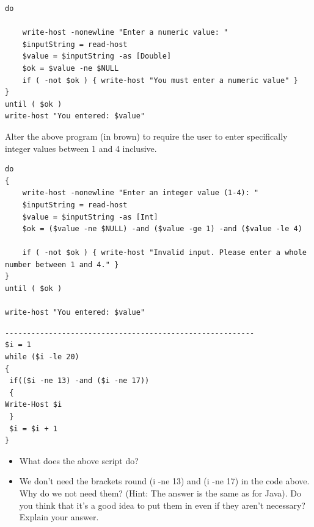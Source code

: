 \documentclass[a4paper]{article}
\begin{document}
\begin{verbatim}
do

    write-host -nonewline "Enter a numeric value: "
    $inputString = read-host
    $value = $inputString -as [Double]
    $ok = $value -ne $NULL
    if ( -not $ok ) { write-host "You must enter a numeric value" }
}
until ( $ok )
write-host "You entered: $value"
\end{verbatim}
\textcolor{green!50!black}{
    Alter the above program (in brown) to require the user to enter
    specifically integer values between 1 and 4 inclusive.
}
\begin{verbatim}
do
{
    write-host -nonewline "Enter an integer value (1-4): "
    $inputString = read-host
    $value = $inputString -as [Int]  
    $ok = ($value -ne $NULL) -and ($value -ge 1) -and ($value -le 4) 
    
    if ( -not $ok ) { write-host "Invalid input. Please enter a whole number between 1 and 4." }
}
until ( $ok )

write-host "You entered: $value"
\end{verbatim}
\begin{verbatim}
---------------------------------------------------------
$i = 1
while ($i -le 20)
{
 if(($i -ne 13) -and ($i -ne 17))
 {
Write-Host $i
 }
 $i = $i + 1
}
\end{verbatim}

\textcolor{green!50!black}{
\begin{itemize}
    \item What does the above script do?
    \item We don’t need the brackets round (i -ne 13) and (i -ne 17) in the code
above. Why do we not need them? (Hint: The answer is the same as for Java). Do
you think that it’s a good idea to put them in even if they aren’t necessary? Explain
your answer.
\end{itemize}
}
\end{document}
